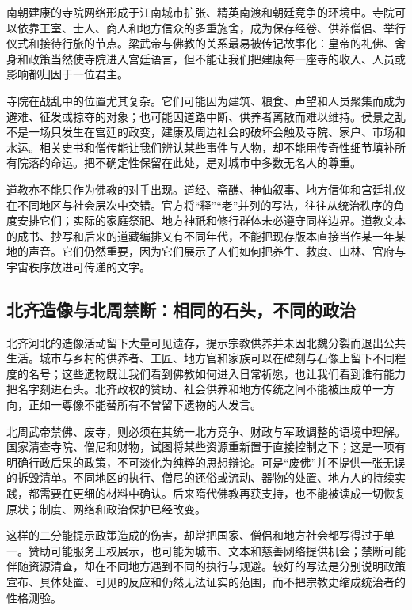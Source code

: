 南朝建康的寺院网络形成于江南城市扩张、精英南渡和朝廷竞争的环境中。寺院可以依靠王室、士人、商人和地方信众的多重施舍，成为保存经卷、供养僧侣、举行仪式和接待行旅的节点。梁武帝与佛教的关系最易被传记故事化：皇帝的礼佛、舍身和政策当然使寺院进入宫廷语言，但不能让我们把建康每一座寺的收入、人员或影响都归因于一位君主。

寺院在战乱中的位置尤其复杂。它们可能因为建筑、粮食、声望和人员聚集而成为避难、征发或掠夺的对象；也可能因道路中断、供养者离散而难以维持。侯景之乱不是一场只发生在宫廷的政变，建康及周边社会的破坏会触及寺院、家户、市场和水运。相关史书和僧传能让我们辨认某些事件与人物，却不能用传奇性细节填补所有院落的命运。把不确定性保留在此处，是对城市中多数无名人的尊重。

道教亦不能只作为佛教的对手出现。道经、斋醮、神仙叙事、地方信仰和宫廷礼仪在不同地区与社会层次中交错。官方将“释”“老”并列的写法，往往从统治秩序的角度安排它们；实际的家庭祭祀、地方神祇和修行群体未必遵守同样边界。道教文本的成书、抄写和后来的道藏编排又有不同年代，不能把现存版本直接当作某一年某地的声音。它们仍然重要，因为它们展示了人们如何把养生、救度、山林、官府与宇宙秩序放进可传递的文字。

\subsection{北齐造像与北周禁断：相同的石头，不同的政治}

北齐河北的造像活动留下大量可见遗存，提示宗教供养并未因北魏分裂而退出公共生活。城市与乡村的供养者、工匠、地方官和家族可以在碑刻与石像上留下不同程度的名号；这些遗物既让我们看到佛教如何进入日常祈愿，也让我们看到谁有能力把名字刻进石头。北齐政权的赞助、社会供养和地方传统之间不能被压成单一方向，正如一尊像不能替所有不曾留下遗物的人发言。

北周武帝禁佛、废寺，则必须在其统一北方竞争、财政与军政调整的语境中理解。国家清查寺院、僧尼和财物，试图将某些资源重新置于直接控制之下；这是一项有明确行政后果的政策，不可淡化为纯粹的思想辩论。可是“废佛”并不提供一张无误的拆毁清单。不同地区的执行、僧尼的还俗或流动、器物的处置、地方人的持续实践，都需要在更细的材料中确认。后来隋代佛教再获支持，也不能被读成一切恢复原状；制度、网络和政治保护已经改变。

\begin{debate}[宗教政策能否解释为“宽容”或“迫害”]
这样的二分能提示政策造成的伤害，却常把国家、僧侣和地方社会都写得过于单一。赞助可能服务王权展示，也可能为城市、文本和慈善网络提供机会；禁断可能伴随资源清查，却在不同地方遇到不同的执行与规避。较好的写法是分别说明政策宣布、具体处置、可见的反应和仍然无法证实的范围，而不把宗教史缩成统治者的性格测验。
\end{debate}

